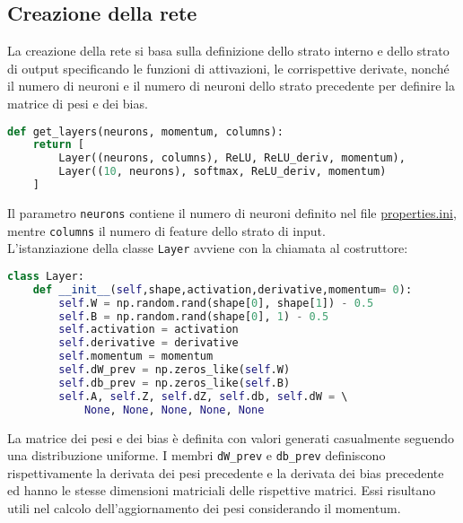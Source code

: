 \subsection{Creazione della rete}
La creazione della rete si basa sulla definizione dello strato interno e dello strato di output specificando le funzioni di attivazioni, le corrispettive derivate, nonché il numero di neuroni e il numero di neuroni dello strato precedente per definire la matrice di pesi e dei bias.
\begin{lstlisting}[language=Python]
def get_layers(neurons, momentum, columns):
    return [
        Layer((neurons, columns), ReLU, ReLU_deriv, momentum), 
        Layer((10, neurons), softmax, ReLU_deriv, momentum)
    ]
\end{lstlisting}
Il parametro \texttt{neurons} contiene il numero di neuroni definito nel file \underline{properties.ini}, mentre \texttt{columns} il numero di feature dello strato di input. \\
L'istanziazione della classe \texttt{Layer} avviene con la chiamata al costruttore:
\begin{lstlisting}[language=Python]
class Layer:
    def __init__(self,shape,activation,derivative,momentum= 0):
        self.W = np.random.rand(shape[0], shape[1]) - 0.5
        self.B = np.random.rand(shape[0], 1) - 0.5
        self.activation = activation
        self.derivative = derivative
        self.momentum = momentum
        self.dW_prev = np.zeros_like(self.W)
        self.db_prev = np.zeros_like(self.B)
        self.A, self.Z, self.dZ, self.db, self.dW = \ 
            None, None, None, None, None
\end{lstlisting}
La matrice dei pesi e dei bias è definita con valori generati casualmente seguendo una distribuzione uniforme. I membri \texttt{dW\_prev} e \texttt{db\_prev} definiscono rispettivamente la derivata dei pesi precedente e la derivata dei bias precedente ed hanno le stesse dimensioni matriciali delle rispettive matrici. Essi risultano utili nel calcolo dell'aggiornamento dei pesi considerando il momentum. \\

